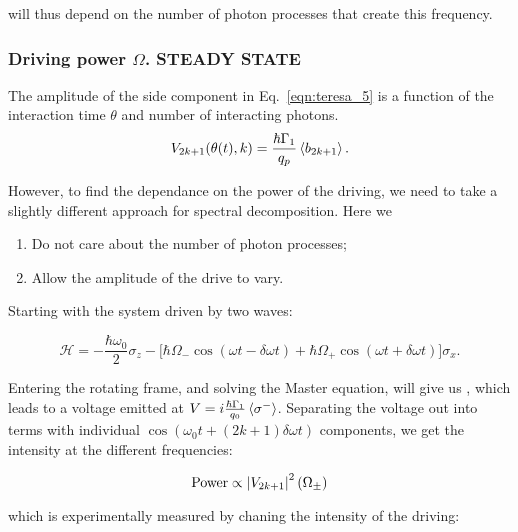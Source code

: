 	\noindent will thus depend on the number of photon processes that create this frequency.
	
	
 \subsubsection{Driving power $ \Omega $. STEADY STATE}
  The amplitude of the side component in Eq.~\eqref{eqn:teresa_5} is a function of the interaction time $ \theta $ and number of interacting photons.
  \[
  			V_{2k+1}(\theta(t), k)=\frac{\hbar\Gamma_1}{q_p}\left\langle b_{2k+1} \right\rangle.
  \]
  
  \noindent However, to find the dependance on the power of the driving, we need to take a slightly different approach for spectral decomposition. Here we
  
  \begin{enumerate}
  	\item Do not care about the number of photon processes;
  	\item Allow the amplitude of the drive to vary.
  \end{enumerate}

  Starting with the system driven by two waves:
  
  \begin{equation}\label{key}
  	\mathcal{H} = -\frac{\hbar\omega_0}{2}\sigma_z - \bigg[\hbar\Omega_-\cos(\omega t  - \delta\omega t) + \hbar\Omega_+\cos(\omega t  + \delta\omega t)\bigg]\sigma_x.
  \end{equation}
  
  \noindent Entering the rotating frame, and solving the Master equation, will give us \isigmaminus, which leads to a voltage emitted at $ V = i\frac{\hbar\Gamma_1}{q_0}\left\langle \sigma^{-} \right\rangle $. Separating the voltage out into terms with individual $ \cos(\omega_0 t + (2k+1)\delta\omega t) $ components, we get the intensity at the different frequencies:
  
  \begin{equation}\label{key}
  	\text{Power} \propto \left|V_{2k+1}\right|^2(\Omega_{\pm}) 
  \end{equation}
  
  \noindent which is experimentally measured by chaning the intensity of the driving:
  
  
